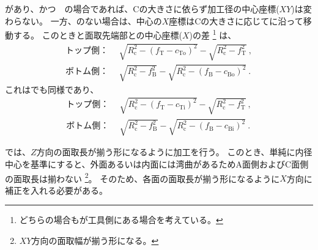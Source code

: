 \clearpage
\Outcut があり、かつ\EndFaceOutCChamfer　の場合であれば、Cの大きさに依らず加工径の中心座標($XY$)は変わらない。
一方、\Outcut のない場合は、中心の$X$座標はCの大きさに応じて\CenterCurvatureLine に沿って移動する。
このとき\EndFace と面取先端部との中心座標($X$)の差
\footnote{どちらの場合も\EndFace が工具側にある場合を考えている。}
は、
\begin{align*}
  \text{トップ側：}&~~
  \sqrt{R_\mathrm c^2-\left(f_\mathrm T-c_\mathrm{To}\right)^2}-\sqrt{R_\mathrm c^2-f_\mathrm T^2}\ ,\\
  \text{ボトム側：}&~~
  \sqrt{R_\mathrm c^2-f_\mathrm B^2}-\sqrt{R_\mathrm c^2-\left(f_\mathrm B-c_\mathrm{Bo}\right)^2}\ .
\end{align*}
これは\EndFaceInCChamfer でも同様であり、
\begin{align*}
  \text{トップ側：}&~~
  \sqrt{R_\mathrm c^2-\left(f_\mathrm T-c_\mathrm{Ti}\right)^2}-\sqrt{R_\mathrm c^2-f_\mathrm T^2}\ ,\\
  \text{ボトム側：}&~~
  \sqrt{R_\mathrm c^2-f_\mathrm B^2}-\sqrt{R_\mathrm c^2-\left(f_\mathrm B-c_\mathrm{Bi}\right)^2}\ .
\end{align*}



\EndFaceChamferMilling では、$Z$方向の面取長が揃う形になるように加工を行う。
このとき、単純に内径中心を基準にすると、外面あるいは内面には湾曲があるためA面側およびC面側の面取長は揃わない
\footnote{$XY$方向の面取幅が揃う形になる。}。
そのため、各面の面取長が揃う形になるように$X$方向に補正を入れる必要がある。



\clearpage


